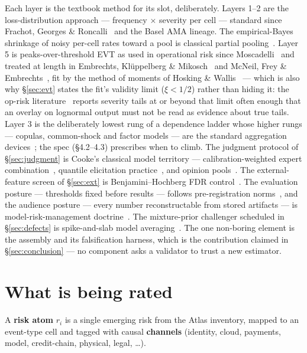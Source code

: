 \documentclass[11pt]{article}
\begin{document}
Each layer is the textbook method for its slot, deliberately. Layers 1--2
are the loss-distribution approach --- frequency $\times$ severity per cell
--- standard since Frachot, Georges \& Roncalli~\cite{frachot2001} and the
Basel AMA lineage. The empirical-Bayes shrinkage of noisy per-cell rates
toward a pool is classical partial pooling~\cite{efron1975}. Layer 5 is
peaks-over-threshold EVT as used in operational risk since
Moscadelli~\cite{moscadelli2004} and treated at length in Embrechts,
Kl\"uppelberg \& Mikosch~\cite{ekm1997} and McNeil, Frey \&
Embrechts~\cite{mcneil2015}, fit by the method of moments of Hosking \&
Wallis~\cite{hosking1987} --- which is also why \S\ref{sec:evt} states the
fit's validity limit ($\xi < 1/2$) rather than hiding it: the op-risk
literature~\cite{moscadelli2004,neslehova2006} reports severity tails at or
beyond that limit often enough that an overlay on lognormal output must not
be read as evidence about true tails. Layer 3 is the deliberately lowest
rung of a dependence ladder whose higher rungs --- copulas, common-shock and
factor models --- are the standard aggregation
devices~\cite{ems2002,bocker2008}; the spec (\S4.2--4.3) prescribes when to
climb. The judgment protocol of \S\ref{sec:judgment} is Cooke's classical
model territory --- calibration-weighted expert combination~\cite{cooke1991},
quantile elicitation practice~\cite{ohagan2006}, and opinion
pools~\cite{genest1986}. The external-feature screen of \S\ref{sec:ext} is
Benjamini--Hochberg FDR control~\cite{bh1995}. The evaluation posture ---
thresholds fixed before results --- follows pre-registration
norms~\cite{nosek2018}, and the audience posture --- every number
reconstructable from stored artifacts --- is model-risk-management
doctrine~\cite{sr117}. The mixture-prior challenger scheduled in
\S\ref{sec:defects} is spike-and-slab model
averaging~\cite{mitchell1988,george1993}. The one non-boring element is the
assembly and its falsification harness, which is the contribution claimed in
\S\ref{sec:conclusion} --- no component asks a validator to trust a new
estimator.

\section{What is being rated}
\label{sec:rated}

A \textbf{risk atom} $r_i$ is a single emerging risk from the Atlas
inventory, mapped to an event-type cell and tagged with causal
\textbf{channels} (identity, cloud, payments, model, credit-chain, physical,
legal, \ldots).
\end{document}
